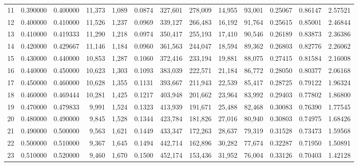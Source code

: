 \begin{tabular}{rrrrrrrrrrrrr}
11 &  0.390000 &  0.400000 &  11,373 &  1,089 &                                     0.0874 &  327,601 &  278,009 &   14,955 &   93,001 &  0.25067 &  0.86147 &  2.57521 \\
12 &  0.400000 &  0.410000 &  11,526 &  1,237 &                                     0.0969 &  339,127 &  266,483 &   16,192 &   91,764 &  0.25615 &  0.85001 &  2.46844 \\
13 &  0.410000 &  0.419333 &  11,290 &  1,218 &                                     0.0974 &  350,417 &  255,193 &   17,410 &   90,546 &  0.26189 &  0.83873 &  2.36386 \\
14 &  0.420000 &  0.429667 &  11,146 &  1,184 &                                     0.0960 &  361,563 &  244,047 &   18,594 &   89,362 &  0.26803 &  0.82776 &  2.26062 \\
15 &  0.430000 &  0.440000 &  10,853 &  1,287 &                                     0.1060 &  372,416 &  233,194 &   19,881 &   88,075 &  0.27415 &  0.81584 &  2.16008 \\
16 &  0.440000 &  0.450000 &  10,623 &  1,303 &                                     0.1093 &  383,039 &  222,571 &   21,184 &   86,772 &  0.28050 &  0.80377 &  2.06168 \\
17 &  0.450000 &  0.460000 &  10,628 &  1,355 &                                     0.1131 &  393,667 &  211,943 &   22,539 &   85,417 &  0.28725 &  0.79122 &  1.96324 \\
18 &  0.460000 &  0.469444 &  10,281 &  1,425 &                                     0.1217 &  403,948 &  201,662 &   23,964 &   83,992 &  0.29403 &  0.77802 &  1.86800 \\
19 &  0.470000 &  0.479833 &   9,991 &  1,524 &                                     0.1323 &  413,939 &  191,671 &   25,488 &   82,468 &  0.30083 &  0.76390 &  1.77545 \\
20 &  0.480000 &  0.490000 &   9,845 &  1,528 &                                     0.1344 &  423,784 &  181,826 &   27,016 &   80,940 &  0.30803 &  0.74975 &  1.68426 \\
21 &  0.490000 &  0.500000 &   9,563 &  1,621 &                                     0.1449 &  433,347 &  172,263 &   28,637 &   79,319 &  0.31528 &  0.73473 &  1.59568 \\
22 &  0.500000 &  0.510000 &   9,367 &  1,645 &                                     0.1494 &  442,714 &  162,896 &   30,282 &   77,674 &  0.32287 &  0.71950 &  1.50891 \\
23 &  0.510000 &  0.520000 &   9,460 &  1,670 &                                     0.1500 &  452,174 &  153,436 &   31,952 &   76,004 &  0.33126 &  0.70403 &  1.42128 \\

\end{tabular}
